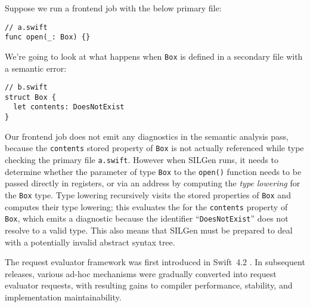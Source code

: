\documentclass[../generics]{subfiles}
\begin{document}
\begin{example}
Suppose we run a frontend job with the below primary file:
\begin{Verbatim}
// a.swift
func open(_: Box) {}
\end{Verbatim}
We're going to look at what happens when \texttt{Box} is defined in a secondary file with a semantic error:
\begin{Verbatim}
// b.swift
struct Box {
  let contents: DoesNotExist
}
\end{Verbatim}

Our frontend job does not emit any diagnostics in the semantic analysis pass, because the \texttt{contents} stored property of \texttt{Box} is not actually referenced while type checking the primary file \texttt{a.swift}. However when SILGen runs, it needs to determine whether the parameter of type \texttt{Box} to the \texttt{open()} function needs to be passed directly in registers, or via an address by computing the \emph{type lowering} for the \texttt{Box} type. Type lowering recursively visits the stored properties of \texttt{Box} and computes their type lowering; this evaluates the  for the \texttt{contents} property of \texttt{Box}, which emits a diagnostic because the identifier ``\texttt{DoesNotExist}'' does not resolve to a valid type. This also means that SILGen must be prepared to deal with a potentially invalid abstract syntax tree.
\end{example}

The request evaluator framework was first introduced in Swift~4.2 \cite{reqeval}. In subsequent releases, various ad-hoc mechanisms were gradually converted into request evaluator requests, with resulting gains to compiler performance, stability, and implementation maintainability.
\end{document}
